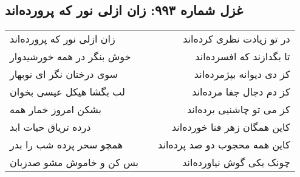 \begin{center}
\section*{غزل شماره ۹۹۳: زان ازلی نور که پرورده‌اند}
\label{sec:0993}
\begin{longtable}{l p{0.5cm} r}
زان ازلی نور که پرورده‌اند
&&
در تو زیادت نظری کرده‌اند
\\
خوش بنگر در همه خورشیدوار
&&
تا بگدازند که افسرده‌اند
\\
سوی درختان نگر ای نوبهار
&&
کز دی دیوانه بپژمرده‌اند
\\
لب بگشا هیکل عیسی بخوان
&&
کز دم دجال جفا مرده‌اند
\\
بشکن امروز خمار همه
&&
کز می تو چاشنیی برده‌اند
\\
درده تریاق حیات ابد
&&
کاین همگان زهر فنا خورده‌اند
\\
همچو سحر پرده شب را بدر
&&
کاین همه محجوب دو صد پرده‌اند
\\
بس کن و خاموش مشو صدزبان
&&
چونک یکی گوش نیاورده‌اند
\\
\end{longtable}
\end{center}
